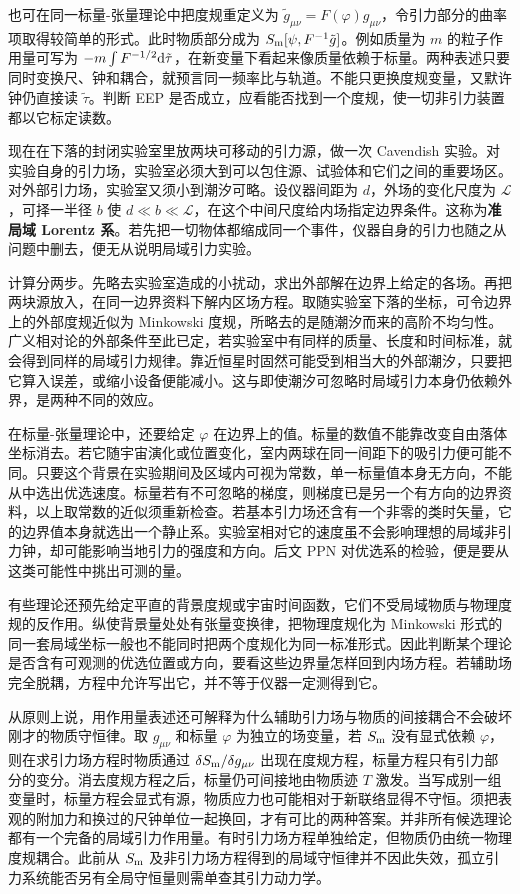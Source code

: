 也可在同一标量-张量理论中把度规重定义为 $\tilde g_{\mu\nu}=F(\varphi)g_{\mu\nu}$，令引力部分的曲率项取得较简单的形式。此时物质部分成为 $S_{\rm m}[\psi,F^{-1}\tilde g]$。例如质量为 $m$ 的粒子作用量可写为 $-m\int F^{-1/2}\dd\tilde\tau$，在新变量下看起来像质量依赖于标量。两种表述只要同时变换尺、钟和耦合，就预言同一频率比与轨道。不能只更换度规变量，又默许钟仍直接读 $\tilde\tau$。判断 EEP 是否成立，应看能否找到一个度规，使一切非引力装置都以它标定读数。

现在在下落的封闭实验室里放两块可移动的引力源，做一次 Cavendish 实验。对实验自身的引力场，实验室必须大到可以包住源、试验体和它们之间的重要场区。对外部引力场，实验室又须小到潮汐可略。设仪器间距为 $d$，外场的变化尺度为 $\mathcal L$，可择一半径 $b$ 使 $d\ll b\ll\mathcal L$，在这个中间尺度给内场指定边界条件。这称为\textbf{准局域 Lorentz 系}。若先把一切物体都缩成同一个事件，仪器自身的引力也随之从问题中删去，便无从说明局域引力实验。

计算分两步。先略去实验室造成的小扰动，求出外部解在边界上给定的各场。再把两块源放入，在同一边界资料下解内区场方程。取随实验室下落的坐标，可令边界上的外部度规近似为 Minkowski 度规，所略去的是随潮汐而来的高阶不均匀性。广义相对论的外部条件至此已定，若实验室中有同样的质量、长度和时间标准，就会得到同样的局域引力规律。靠近恒星时固然可能受到相当大的外部潮汐，只要把它算入误差，或缩小设备便能减小。这与即使潮汐可忽略时局域引力本身仍依赖外界，是两种不同的效应。

在标量-张量理论中，还要给定 $\varphi$ 在边界上的值。标量的数值不能靠改变自由落体坐标消去。若它随宇宙演化或位置变化，室内两球在同一间距下的吸引力便可能不同。只要这个背景在实验期间及区域内可视为常数，单一标量值本身无方向，不能从中选出优选速度。标量若有不可忽略的梯度，则梯度已是另一个有方向的边界资料，以上取常数的近似须重新检查。若基本引力场还含有一个非零的类时矢量，它的边界值本身就选出一个静止系。实验室相对它的速度虽不会影响理想的局域非引力钟，却可能影响当地引力的强度和方向。后文 PPN 对优选系的检验，便是要从这类可能性中挑出可测的量。

有些理论还预先给定平直的背景度规或宇宙时间函数，它们不受局域物质与物理度规的反作用。纵使背景量处处有张量变换律，把物理度规化为 Minkowski 形式的同一套局域坐标一般也不能同时把两个度规化为同一标准形式。因此判断某个理论是否含有可观测的优选位置或方向，要看这些边界量怎样回到内场方程。若辅助场完全脱耦，方程中允许写出它，并不等于仪器一定测得到它。

从原则上说，用作用量表述还可解释为什么辅助引力场与物质的间接耦合不会破坏刚才的物质守恒律。取 $g_{\mu\nu}$ 和标量 $\varphi$ 为独立的场变量，若 $S_{\rm m}$ 没有显式依赖 $\varphi$，则在求引力场方程时物质通过 $\delta S_{\rm m}/\delta g_{\mu\nu}$ 出现在度规方程，标量方程只有引力部分的变分。消去度规方程之后，标量仍可间接地由物质迹 $T$ 激发。当写成别一组变量时，标量方程会显式有源，物质应力也可能相对于新联络显得不守恒。须把表观的附加力和换过的尺钟单位一起换回，才有可比的两种答案。并非所有候选理论都有一个完备的局域引力作用量。有时引力场方程单独给定，但物质仍由统一物理度规耦合。此前从 $S_{\rm m}$ 及非引力场方程得到的局域守恒律并不因此失效，孤立引力系统能否另有全局守恒量则需单查其引力动力学。

